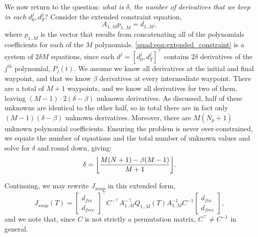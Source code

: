 We now return to the question: \emph{what is $\delta$, the number of derivatives that we keep in each} $d_0^j, d_T^j$? Consider the extended constraint equation,
\begin{equation}
    A_{1..M} p_{1..M} = d_{1..M},
\label{quad:eqn:extended_constraint}
\end{equation}
where $p_{1..M}$ is the vector that results from concatenating all of the polynomials coefficients for each of the $M$ polynomials. \autoref{quad:eqn:extended_constraint} is a system of $2\delta M$ equations, since each $d^j = {[d_0^j, d_T^j]}^\top$ contains $2\delta$ derivatives of the $j^{th}$ polynomial, $P_j(t)$. We assume we know all derivatives at the initial and final waypoint, and that we know $\beta$ derivatives at every intermediate waypoint. There are a total of $M+1$ waypoints, and we know all derivatives for two of them, leaving $(M-1)\cdot 2(\delta - \beta)$ unknown derivatives. As discussed, half of these unknowns are identical to the other half, so in total there are in fact only $(M-1)(\delta-\beta)$ unknown derivatives. Moreover, there are $M(N_p + 1)$ unknown polynomial coefficients. Ensuring the problem is never over-constrained, we equate the number of equations and the total number of unknown values and solve for $\delta$ and round down, giving:
\begin{equation}
    \delta = \floor*{\frac{M(N+1) - \beta(M-1)}{M+1}}.
\label{quad:eqn:delta}
\end{equation}

Continuing, we may rewrite $J_{snap}$ in this extended form,
\begin{equation}
    J_{snap}(T) = {\begin{bmatrix}
                        d_{fix} \\
                        d_{free}
                   \end{bmatrix}}^\top
                   C^{-\top} A_{1..M}^{-\top} Q_{1..M}(T) A_{1..M}^{-1} C^{-1}
                   \begin{bmatrix}
                        d_{fix} \\
                        d_{free}
                   \end{bmatrix},
\end{equation}
and we note that, since $C$ is not strictly a permutation matrix, $C^\top \neq C^{-1}$ in general.

